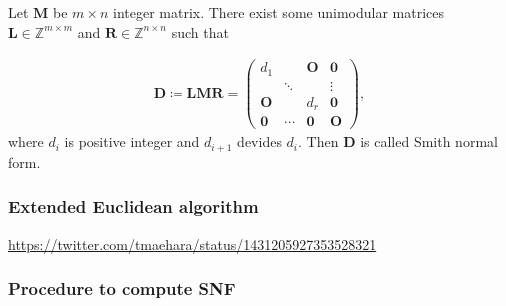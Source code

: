 Let $\bm{M}$ be $m \times n$ integer matrix.
There exist some unimodular matrices $\bm{L} \in \mathbb{Z}^{m \times m}$ and $\bm{R} \in \mathbb{Z}^{n \times n}$ such that

\begin{align}
    \bm{D}
    \coloneqq
    \bm{LMR}
    =
    \begin{pmatrix}
        d_{1}  &        & \bm{O} & \bm{0} \\
               & \ddots &        & \vdots \\
        \bm{O} &        & d_{r}  & \bm{0} \\
        \bm{0} & \cdots & \bm{0} & \bm{O}
    \end{pmatrix},
\end{align}
where $d_{i}$ is positive integer and $d_{i+1}$ devides $d_{i}$.
Then $\bm{D}$ is called Smith normal form.

\subsubsection{Extended Euclidean algorithm}

\url{https://twitter.com/tmaehara/status/1431205927353528321}

\subsubsection{Procedure to compute SNF}

